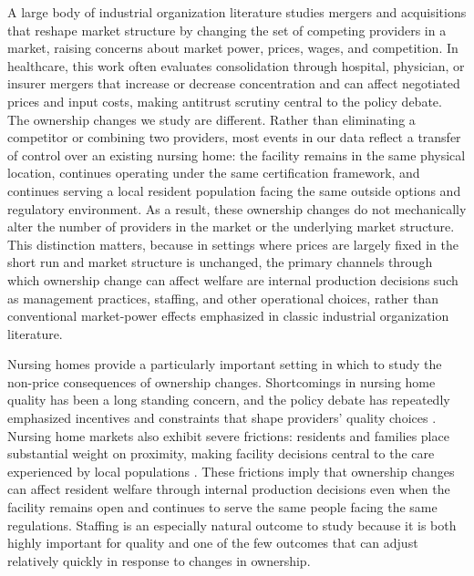 \documentclass[preprint,authoryear]{elsarticle}
\begin{document}
A large body of industrial organization literature studies mergers and acquisitions that reshape market structure by changing the set of competing providers in a market, raising concerns about market power, prices, wages, and competition. In healthcare, this work often evaluates consolidation through hospital, physician, or insurer mergers that increase or decrease concentration and can affect negotiated prices and input costs, making antitrust scrutiny central to the policy debate. The ownership changes we study are different. Rather than eliminating a competitor or combining two providers, most events in our data reflect a transfer of control over an existing nursing home: the facility remains in the same physical location, continues operating under the same certification framework, and continues serving a local resident population facing the same outside options and regulatory environment. As a result, these ownership changes do not mechanically alter the number of providers in the market or the underlying market structure. This distinction matters, because in settings where prices are largely fixed in the short run and market structure is unchanged, the primary channels through which ownership change can affect welfare are internal production decisions such as management practices, staffing, and other operational choices, rather than conventional market-power effects emphasized in classic industrial organization literature.

Nursing homes provide a particularly important setting in which to study the non-price consequences of ownership changes. Shortcomings in nursing home quality has been a long standing concern, and the policy debate has repeatedly emphasized incentives and constraints that shape providers’ quality choices \citep{hackmann_2019}. Nursing home markets also exhibit severe frictions: residents and families place substantial weight on proximity, making facility decisions central to the care experienced by local populations \citep{gupta_et_al_2021}. These frictions imply that ownership changes can affect resident welfare through internal production decisions even when the facility remains open and continues to serve the same people facing the same regulations. Staffing is an especially natural outcome to study because it is both highly important for quality and one of the few outcomes that can adjust relatively quickly in response to changes in ownership.
\end{document}
